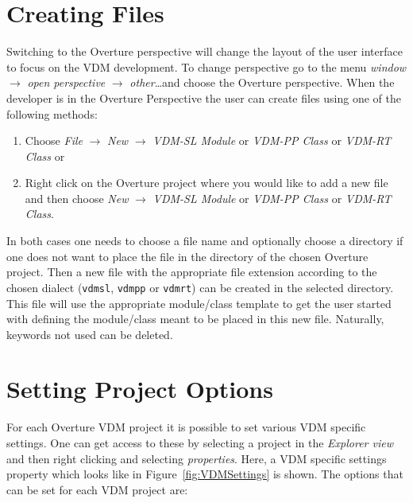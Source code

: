 \documentclass{overturerepchap}
\begin{document}

\section{Creating Files}

Switching to the Overture perspective will change the layout of the user
interface to focus on the VDM development. To change perspective go to the menu 
\emph{window} $\rightarrow$ \emph{open perspective} $\rightarrow$ \emph{other}\ldots and choose the
Overture perspective.
When the developer is in the Overture Perspective the user can create files
using one of the following methods:

\begin{enumerate}
  \item Choose \emph{File} $\rightarrow$ \emph{New} $\rightarrow$
    \emph{VDM-SL Module} or 
    \emph{VDM-PP Class} or 
    \emph{VDM-RT Class} or
  \item Right click on the Overture project where you would like to
    add a new file and then choose \emph{New} $\rightarrow$ 
    \emph{VDM-SL Module} or \emph{VDM-PP Class} or \emph{VDM-RT Class}.
\end{enumerate}

In both cases one needs to choose a file name and optionally choose a
directory if one does not want to place the file in the directory of
the chosen Overture project. Then a new file with the appropriate file
extension according to the chosen dialect (\texttt{vdmsl},
\texttt{vdmpp} or \texttt{vdmrt}) can be
created in the selected directory. This file will use the appropriate
module/class template to get the user started with defining the
module/class meant to be placed in this new file. Naturally, keywords 
not used can be deleted.

\section{Setting Project Options}\label{subsec:options}

For each Overture VDM project it is possible to set various VDM
specific settings. One can get access to these by selecting a project
in the \emph{Explorer view} and then right clicking and selecting
\emph{properties}. Here, a VDM specific settings property which
looks like in Figure~\ref{fig:VDMSettings} is shown. The options 
that can be set for each VDM project are:
\end{document}
